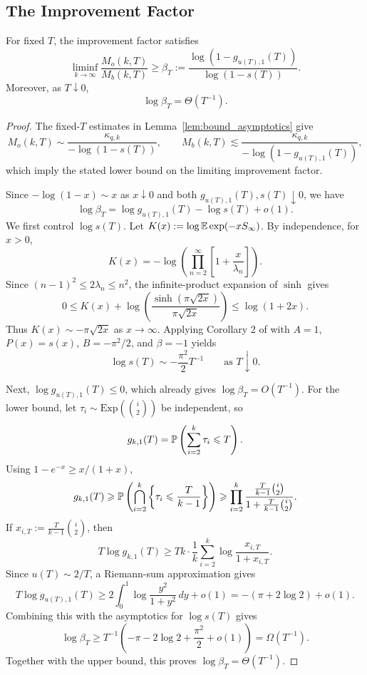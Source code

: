 \subsection{The Improvement Factor}
\label{sec:asymptotic-improvement-factor}

\begin{lemma}
\label{lem:improvement_ratio_asymptotics}
For fixed $T$, the improvement factor satisfies
\[
\liminf_{k\to\infty}\frac{M_o(k,T)}{M_b(k,T)}
\geq \beta_T
:=\frac{\log(1-g_{u(T),1}(T))}{\log(1-s(T))}.
\]
Moreover, as $T\downarrow0$,
\[
\log\beta_T=\Theta(T^{-1}).
\]
\end{lemma}

\begin{proof}
The fixed-$T$ estimates in Lemma~\ref{lem:bound_asymptotics} give
\[
M_o(k,T)\sim\frac{\kappa_{q,k}}{-\log(1-s(T))},
\qquad
M_b(k,T)\lesssim
\frac{\kappa_{q,k}}{-\log(1-g_{u(T),1}(T))},
\]
which imply the stated lower bound on the limiting improvement factor.

Since $-\log(1-x)\sim x$ as $x\downarrow0$ and both
$g_{u(T),1}(T),s(T)\downarrow0$, we have
\[
\log\beta_T=\log g_{u(T),1}(T)-\log s(T)+o(1).
\]
We first control $\log s(T)$. Let
$K(x):=\log\E\exp(-xS_\infty)$. By independence, for $x>0$,
\[
K(x)=-\log\left(\prod_{n=2}^\infty
\left[1+\frac{x}{\lambda_n}\right]\right).
\]
Since $(n-1)^2\leq2\lambda_n\leq n^2$, the infinite-product expansion of
$\sinh$ gives
\[
0\leq K(x)+\log\left(\frac{\sinh(\pi\sqrt{2x})}{\pi\sqrt{2x}}\right)
\leq\log(1+2x).
\]
Thus $K(x)\sim-\pi\sqrt{2x}$ as $x\to\infty$. Applying Corollary 2 of
\cite{cadena2015_tauberian_theorems_exponential_type} with
$A=1$, $P(x)=s(x)$, $B=-\pi^2/2$, and $\beta=-1$ yields
\[
\log s(T)\sim-\frac{\pi^2}{2}T^{-1}
\qquad\text{as }T\downarrow0.
\]

Next, $\log g_{u(T),1}(T)\leq0$, which already gives
$\log\beta_T=O(T^{-1})$. For the lower bound, let
$\tau_i\sim\mathrm{Exp}(\binom{i}{2})$ be independent, so
\[
g_{k,1}(T)=\P\left(\sum_{i=2}^k\tau_i\leq T\right).
\]
Using $1-e^{-x}\geq x/(1+x)$,
\[
g_{k,1}(T)
\geq\P\left(\bigcap_{i=2}^k
\left\{\tau_i\leq\frac{T}{k-1}\right\}\right)
\geq\prod_{i=2}^k
\frac{\frac{T}{k-1}\binom{i}{2}}
{1+\frac{T}{k-1}\binom{i}{2}}.
\]
If $x_{i,T}:=\frac{T}{k-1}\binom{i}{2}$, then
\[
T\log g_{k,1}(T)
\geq Tk\cdot\frac{1}{k}\sum_{i=2}^k
\log\frac{x_{i,T}}{1+x_{i,T}}.
\]
Since $u(T)\sim2/T$, a Riemann-sum approximation gives
\[
T\log g_{u(T),1}(T)
\geq2\int_0^1\log\frac{y^2}{1+y^2}\,dy+o(1)
=-(\pi+2\log2)+o(1).
\]
Combining this with the asymptotics for $\log s(T)$ gives
\[
\log\beta_T
\geq T^{-1}\left(-\pi-2\log2+\frac{\pi^2}{2}+o(1)\right)
=\Omega(T^{-1}).
\]
Together with the upper bound, this proves
$\log\beta_T=\Theta(T^{-1})$.
\end{proof}

